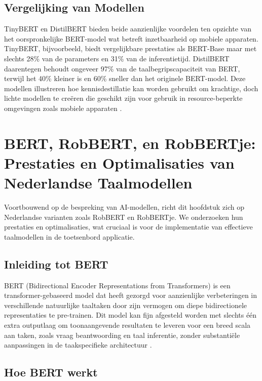 \subsection{Vergelijking van Modellen}

TinyBERT en DistilBERT bieden beide aanzienlijke voordelen ten opzichte van het oorspronkelijke BERT-model wat betreft inzetbaarheid op mobiele apparaten. TinyBERT, bijvoorbeeld, biedt vergelijkbare prestaties als BERT-Base maar met slechts 28\% van de parameters en 31\% van de inferentietijd. DistilBERT daarentegen behoudt ongeveer 97\% van de taalbegripscapaciteit van BERT, terwijl het 40\% kleiner is en 60\% sneller dan het originele BERT-model. Deze modellen illustreren hoe kennisdestillatie kan worden gebruikt om krachtige, doch lichte modellen te creëren die geschikt zijn voor gebruik in resource-beperkte omgevingen zoals mobiele apparaten \autocite{Sanh2019DistilBERT}.


\section{BERT, RobBERT, en RobBERTje: Prestaties en Optimalisaties van Nederlandse Taalmodellen}

Voortbouwend op de bespreking van AI-modellen, richt dit hoofdstuk zich op Nederlandse varianten zoals RobBERT en RobBERTje. We onderzoeken hun prestaties en optimalisaties, wat cruciaal is voor de implementatie van effectieve taalmodellen in de toetsenbord applicatie.

\subsection{Inleiding tot BERT}

BERT (Bidirectional Encoder Representations from Transformers) is een trans\-for\-mer-gebaseerd model dat heeft gezorgd voor aanzienlijke verbeteringen in verschillende natuurlijke taaltaken door zijn vermogen om diepe bidirectionele representaties te pre-trainen. Dit model kan fijn afgesteld worden met slechts één extra outputlaag om toonaangevende resultaten te leveren voor een breed scala aan taken, zoals vraag beantwoording en taal inferentie, zonder substantiële aanpassingen in de taakspecifieke architectuur \autocite{Devlin2019}.

\subsection{Hoe BERT werkt}

